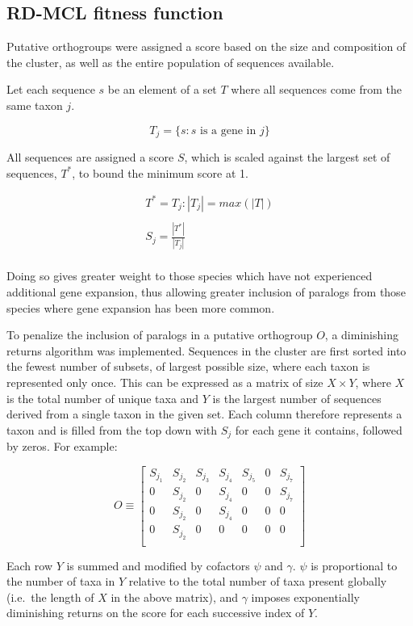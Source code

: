 \documentclass[twocolumn]{bmcart}  %
\begin{document}
\subsection{RD-MCL fitness function}\label{subsec:rd-mclFitnessFunction}
Putative orthogroups were assigned a score based on the size and composition of the cluster, as well as the entire population of sequences available.

Let each sequence $s$ be an element of a set $T$ where all sequences come from the same taxon $j$.

\[
T_j = \{s:s \text{ is a gene in } j\}
\]

All sequences are assigned a score $S$, which is scaled against the largest set of sequences, $T^*$, to bound the minimum score at 1.

\begin{gather*}
    T^* = T_j:|T_j| = max(|T|)\\
    \\
    S_j = \frac{|T^*|}{|T_j|}\\
\end{gather*}

Doing so gives greater weight to those species which have not experienced additional gene expansion, thus allowing greater inclusion of paralogs from those species where gene expansion has been more common.

To penalize the inclusion of paralogs in a putative orthogroup $O$, a diminishing returns algorithm was implemented.
Sequences in the cluster are first sorted into the fewest number of subsets, of largest possible size, where each taxon is represented only once.
This can be expressed as a matrix of size $X \times Y$, where $X$ is the total number of unique taxa and $Y$ is the largest number of sequences derived from a single taxon in the given set.
Each column therefore represents a taxon and is filled from the top down with $S_j$ for each gene it contains, followed by zeros.
For example:


\[
O \equiv
\begin{bmatrix}
    S_{j_1} & S_{j_2} & S_{j_3} & S_{j_4} & S_{j_5} & 0 & S_{j_7}\\
    0 & S_{j_2} & 0 & S_{j_4} & 0 & 0 & S_{j_7} \\
    0 & S_{j_2} & 0 & S_{j_4} & 0 & 0 & 0 \\
    0 & S_{j_2} & 0 & 0 & 0 & 0 & 0 \\
\end{bmatrix}
\]

Each row $Y$ is summed and modified by cofactors $\psi$ and $\gamma$. $\psi$ is proportional to the number of taxa in $Y$ relative to the total number of taxa present globally (i.e.\ the length of $X$ in the above matrix), and $\gamma$ imposes exponentially diminishing returns on the score for each successive index of $Y$.
\end{document}
